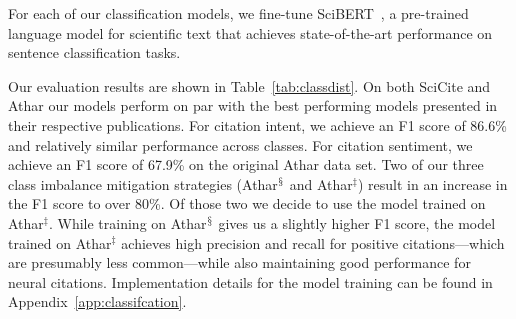 For each of our classification models, we fine-tune SciBERT~\cite{Beltagy2019}, a pre-trained language model for scientific text that achieves state-of-the-art performance on sentence classification tasks.

Our evaluation results are shown in Table~\ref{tab:classdist}. On both SciCite and Athar our models perform on par with the best performing models presented in their respective publications. For citation intent, we achieve an F1 score of 86.6\% and relatively similar performance across classes. For citation sentiment, we achieve an F1 score of 67.9\% on the original Athar data set. Two of our three class imbalance mitigation strategies (Athar$^{\mathsection}$ and Athar$^{\ddagger}$) result in an increase in the F1 score to over 80\%. Of those two we decide to use the model trained on Athar$^{\ddagger}$. While training on Athar$^{\mathsection}$ gives us a slightly higher F1 score, the model trained on Athar$^{\ddagger}$ achieves high precision and recall for positive citations---which are presumably less common---while also maintaining good performance for neural citations.
Implementation details for the model training can be found in Ap\-pen\-dix~\ref{app:classifcation}.

